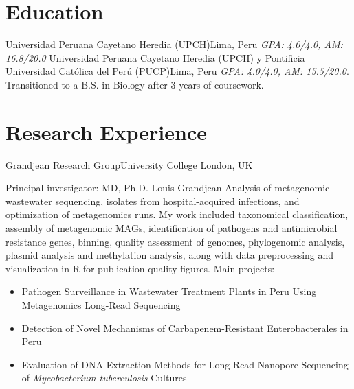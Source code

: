 \documentclass[11pt,a4paper,sans]{moderncv}
\begin{document}
\makecvtitle
\vspace{-1cm}

\section{Education}
{Universidad Peruana Cayetano Heredia (UPCH)}{Lima, Peru}{}
{\textit{GPA: 4.0/4.0, AM: 16.8/20.0}}  %
  {Universidad Peruana Cayetano Heredia (UPCH) y Pontificia Universidad Católica del Perú (PUCP)}{Lima, Peru}{}
  {\textit{GPA: 4.0/4.0, AM: 15.5/20.0}. Transitioned to a B.S. in Biology after 3 years of coursework.}
\section{Research Experience}
  {Grandjean Research Group}{University College London, UK}{}
  {Principal investigator: MD, Ph.D. Louis Grandjean\newline{}%
  Analysis of metagenomic wastewater sequencing, isolates from hospital-acquired infections, and optimization of metagenomics runs. My work included taxonomical classification, assembly of metagenomic MAGs, identification of pathogens and antimicrobial resistance genes, binning, quality assessment of genomes, phylogenomic analysis, plasmid analysis and methylation analysis, along with data preprocessing and visualization in R for publication-quality figures.
  Main projects:%
  \begin{itemize}%
  \item Pathogen Surveillance in Wastewater Treatment Plants in Peru Using Metagenomics Long-Read Sequencing
  \item Detection of Novel Mechanisms of Carbapenem-Resistant Enterobacterales in Peru
  \item Evaluation of DNA Extraction Methods for Long-Read Nanopore Sequencing of \textit{Mycobacterium tuberculosis} Cultures
  \end{itemize}
  }
\end{document}
